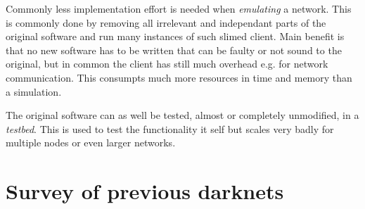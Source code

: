Commonly less implementation effort is needed when \emph{emulating} a network. This is commonly done by removing all irrelevant and independant parts of the original software and run many instances of such slimed client. Main benefit is that no new software has to be written that can be faulty or not sound to the original, but in common the client has still much overhead e.g. for network communication. This consumpts much more resources in time and memory than a simulation.

The original software can as well be tested, almost or completely unmodified, in a \emph{testbed}. This is used to test the functionality it self but scales very badly for multiple nodes or even larger networks. 

\section{Survey of previous darknets}


